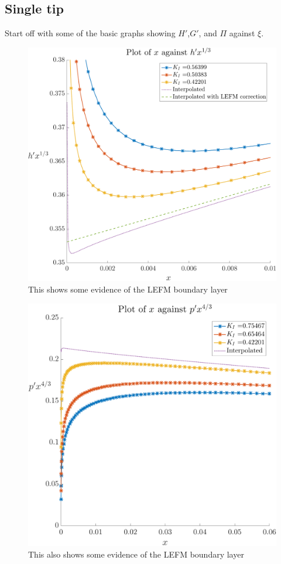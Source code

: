 \documentclass{jfm}
\begin{document}
\subsection{Single tip}
Start off with some of the basic graphs showing $H'$,$G'$, and $\Pi$ against
$\xi$.
\begin{figure}
  \centerline{\includegraphics[scale=0.3]{./../../Graphs/hprime-x.pdf}}
  \caption{This shows some evidence of the LEFM boundary layer}
\end{figure}
\begin{figure}
  \centerline{\includegraphics[scale=0.3]{./../../Graphs/pprime-x.pdf}}
  \caption{This also shows some evidence of the LEFM boundary layer}
\end{figure}
\end{document}
